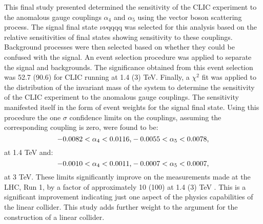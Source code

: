 This final study presented determined the sensitivity of the CLIC experiment to the anomalous gauge couplings $\alpha_{4}$ and $\alpha_{5}$ using the vector boson scattering process.  The signal final state ${\nu}{\nu}$qqqq was selected for this analysis based on the relative sensitivities of final states showing sensitivity to these couplings.  Background processes were then selected based on whether they could be confused with the signal.  An event selection procedure was applied to separate the signal and backgrounds.  The significance obtained from this event selection was 52.7 (90.6) for CLIC running at 1.4 (3) TeV.  Finally, a $\chi^{2}$ fit was applied to the distribution of the invariant mass of the system to determine the sensitivity of the CLIC experiment to the anomalous gauge couplings.  The sensitivity manifested itself in the form of event weights for the signal final state.  Using this procedure the one $\sigma$ confidence limits on the couplings, assuming the corresponding coupling is zero, were found to be:
%
\begin{equation}
-0.0082 < \alpha_{4} < 0.0116 \text{,} \\
-0.0055 < \alpha_{5} < 0.0078 \text{,}
\end{equation}
%
\noindent at 1.4 TeV and:
%
\begin{equation}
-0.0010 < \alpha_{4} < 0.0011 \text{,} \\
-0.0007 < \alpha_{5} < 0.0007 \text{,}
\end{equation}
%
\noindent at 3 TeV.  These limits significantly improve on the measurements made at the LHC, Run 1, by a factor of approximately 10 (100) at 1.4 (3) TeV \cite{Green:2016trm}.  This is a significant improvement indicating just one aspect of the physics capabilities of the linear collider.  This study adds further weight to the argument for the construction of a linear collider.   

